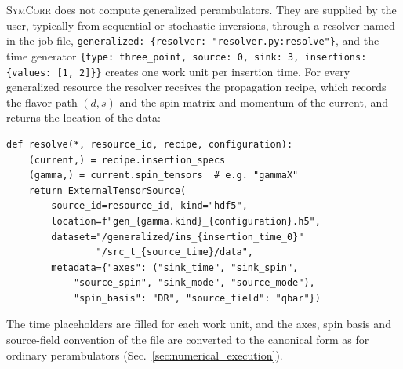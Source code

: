 \documentclass[a4paper,fleqn]{cas-dc}
\begin{document}
\textsc{SymCorr} does not compute generalized perambulators. They are supplied by
the user, typically from sequential or stochastic inversions, through a resolver
named in the job file, \texttt{generalized: \{resolver: "resolver.py:resolve"\}},
and the time generator \texttt{\{type: three\_point, source: 0, sink: 3,
insertions: \{values: [1, 2]\}\}} creates one work unit per insertion time. For
every generalized resource the resolver receives the propagation recipe, which
records the flavor path \((d,s)\) and the spin matrix and momentum of the current,
and returns the location of the data:
{\footnotesize
\begin{verbatim}
def resolve(*, resource_id, recipe, configuration):
    (current,) = recipe.insertion_specs
    (gamma,) = current.spin_tensors  # e.g. "gammaX"
    return ExternalTensorSource(
        source_id=resource_id, kind="hdf5",
        location=f"gen_{gamma.kind}_{configuration}.h5",
        dataset="/generalized/ins_{insertion_time_0}"
                "/src_t_{source_time}/data",
        metadata={"axes": ("sink_time", "sink_spin",
            "source_spin", "sink_mode", "source_mode"),
            "spin_basis": "DR", "source_field": "qbar"})
\end{verbatim}
}
\noindent
The time placeholders are filled for each work unit, and the axes, spin basis and
source-field convention of the file are converted to the canonical form as for ordinary perambulators
(Sec.~\ref{sec:numerical_execution}).
\end{document}
